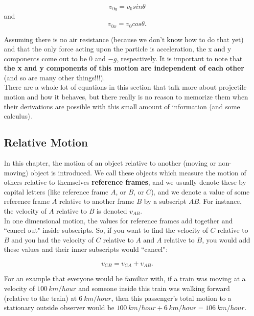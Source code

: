 \documentclass[12pt,letterpaper]{article}
\begin{document}
\begin{center}
	$$v_{0y} = v_{0}sin\theta$$ and
	$$v_{0x} = v_{0}cos\theta.$$ \linebreak
\end{center}

Assuming there is no air resistance (because we don't know how to do that yet) and that the only force acting upon the particle is acceleration, the x and y components come out to be $0$ and $-g$, respectively. It is important to note that \textbf{the x and y components of this motion are independent of each other} (and so are many other things!!!). \\

There are a whole lot of equations in this section that talk more about projectile motion and how it behaves, but there really is no reason to memorize them when their derivations are possible with this small amount of information (and some calculus). \\

\subsection[Relative Motion]{Relative Motion}

In this chapter, the motion of an object relative to another (moving or non-moving) object is introduced. We call these objects which measure the motion of others relative to themselves \textbf{reference frames}, and we usually denote these by capital letters (like reference frame $A$, or $B$, or $C$), and we denote a value of some reference frame $A$ relative to another frame $B$ by a subscript $AB$. For instance, the velocity of $A$ relative to $B$ is denoted $v_{AB}$. \\

In one dimensional motion, the values for reference frames add together and ``cancel out" inside subscripts. So, if you want to find the velocity of $C$ relative to $B$ and you had the velocity of $C$ relative to $A$ and $A$ relative to $B$, you would add these values and their inner subscripts would ``cancel":

\begin{center}
	$$v_{CB} = v_{CA} + v_{AB}.$$\linebreak
\end{center}

For an example that everyone would be familiar with, if a train was moving at a velocity of $100\ km/hour$ and someone inside this train was walking forward (relative to the train) at $6\ km/hour$, then this passenger's total motion to a stationary outside observer would be $100\ km/hour + 6\ km/hour = 106\ km/hour$. \\
\end{document}
